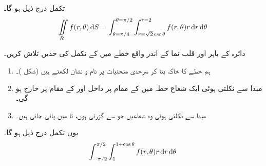  تکمل درج ذیل ہو گا۔
\begin{align*}
\iint\limits_R f(r,\theta)\dif S=\int_{\theta=\pi/4}^{\theta=\pi/2}\int_{r=\sqrt{2}\csc\theta}^{r=2}f(r,\theta)r\dif r\dif \theta
\end{align*}

دائرہ  کے باہر اور قلب نما  کے اندر  واقع خطے  میں   کے تکمل کی  حدیں  تلاش کریں۔ 

\begin{enumerate}[1.]
\item
{}\quad
ہم خطے کا خاکہ بنا کر  سرحدی منحنیات پر نام و نشان لکھتے ہیں (شکل )۔
\item
{}\quad
مبدا سے  نکلتی ہوئی   ایک شعاع خطہ  میں  کے مقام پر داخل اور  کے مقام پر خارج ہو گی۔
\item
{}\quad
مبدا سے نکلتی ہوئی وہ شعاعیں جو  سے گزرتی ہوں،  تا   میں پائی جاتی ہیں۔
\end{enumerate}
یوں تکمل درج ذیل ہو گا۔
\begin{align*}
\int_{-\pi/2}^{\pi/2}\int_{1}^{1+\cos\theta}f(r,\theta)r\dif r\dif \theta
\end{align*}

